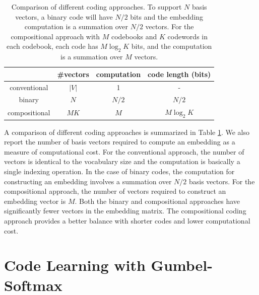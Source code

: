 \documentclass{article} %
\begin{document}
\begin{table}[h]
\begin{center}
    \begin{tabular}{c|c|c|c}
    \hline \hline
    & {\bf \#vectors} & {\bf computation} & {\bf code length (bits)} \\
    \hline
    conventional & $|V|$ & 1 & - \\
    \hline
    binary & $N$ & $N / 2$ & $N / 2$ \\
    compositional & $MK$ & $M$ & $M \log_2 K$ \\
    \hline \hline
    \end{tabular}
    \caption{Comparison of different coding approaches. To support $N$ basis vectors, a binary code will have $N/2$ bits and the embedding computation is a summation over $N/2$ vectors. For the compositional approach with $M$ codebooks and $K$ codewords in each codebook, each code has $M \log_2 K$ bits, and the computation is a summation over $M$ vectors.}
    \label{table:compare}
\end{center}
\end{table}

A comparison of different coding approaches is summarized in Table \ref{table:compare}. We also report the number of basis vectors required to compute an embedding as a measure of computational cost. For the conventional approach, the number of vectors is identical to the vocabulary size and the computation is basically a single indexing operation. In the case of binary codes, the computation for constructing an embedding involves a summation over $N/2$ basis vectors. For the compositional approach, the number of vectors required to construct an embedding vector is $M$. Both the binary and compositional approaches have significantly fewer  vectors in the embedding matrix. The compositional coding approach provides a better balance with shorter codes and lower computational cost.

\section{Code Learning with Gumbel-Softmax}
\label{section:code}
\end{document}
